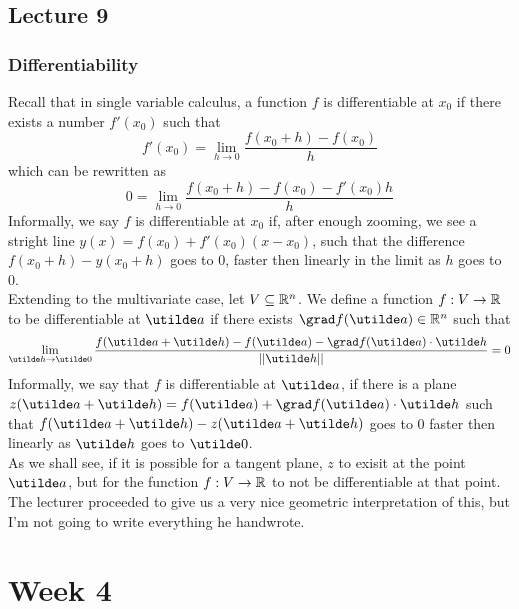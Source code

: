 \documentclass{report}
\begin{document}
\pagebreak
\section{Lecture 9}
\subsection*{Differentiability}
Recall that in single variable calculus, a function $f$ is differentiable at $x_0$ if there exists a number $f'(x_0)$ such that
$$
	f'(x_0) = \lim_{h\to0} \frac{f(x_0 + h) - f(x_0)}{h} 
$$
which can be rewritten as 
$$
	0 = \lim_{h\to0} \frac{f(x_0 + h) - f(x_0) - f'(x_0)h}{h}
$$
Informally, we say $f$ is differentiable at $x_0$ if, after enough zooming, we see a stright line $y(x) = f(x_0)+f'(x_0)(x-x_0)$, such that the difference $f(x_0+h) - y(x_0+h)$ goes to 0, faster then linearly in the limit as $h$ goes to 0. \\

Extending to the multivariate case, let $V\subseteq \mathbb{R}^n$. We define a function $f:V\to\mathbb{R}$ to be differentiable at $\ut{a}$ if there exists $\grad f(\ut{a})\in\bbr^n$ such that 
$$
	\lim_{\ut{h}\to \ut{0}} \frac{f(\ut{a}+\ut{h}) - f(\ut{a}) - \grad f(\ut{a})\cd\ut{h}}{||\ut{h}||} = 0
$$
Informally, we say that $f$ is differentiable at $\ut{a}$, if there is a plane $z(\ut{a}+\ut{h}) = f(\ut{a}) + \grad f(\ut{a})\cd\ut{h}$ such that $f(\ut{a}+\ut{h}) - z(\ut{a}+\ut{h})$ goes to 0 faster then linearly as $\ut{h}$ goes to $\ut{0}$. \\

As we shall see, if it is possible for a tangent plane, $z$ to exisit at the point $\ut{a}$, but for the function $f:V\to\mathbb{R}$ to not be differentiable at that point. \\

The lecturer proceeded to give us a very nice geometric interpretation of this, but I'm not going to write everything he handwrote.



\chapter{Week 4}
\end{document}
